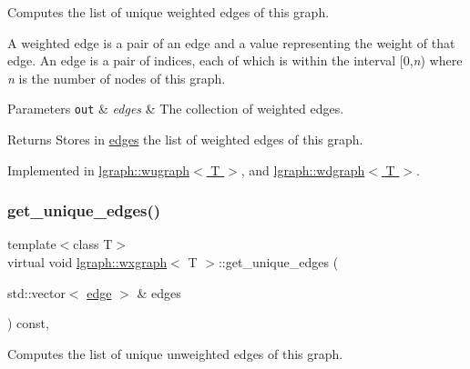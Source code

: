 Computes the list of unique weighted edges of this graph. 

A weighted edge is a pair of an edge and a value representing the weight of that edge. An edge is a pair of indices, each of which is within the interval \mbox{[}0,{\itshape n}) where {\itshape n} is the number of nodes of this graph.


\begin{DoxyParams}[1]{Parameters}
\mbox{\tt out}  & {\em edges} & The collection of weighted edges. \\
\hline
\end{DoxyParams}
\begin{DoxyReturn}{Returns}
Stores in \hyperlink{classlgraph_1_1wxgraph_a1b89f56544185e33d54e72a8ed19a789}{edges} the list of weighted edges of this graph. 
\end{DoxyReturn}


Implemented in \hyperlink{classlgraph_1_1wugraph_af0172a57b7e544029b849f096811c36f}{lgraph\+::wugraph$<$ T $>$}, and \hyperlink{classlgraph_1_1wdgraph_a1b290b91e69ad2c6f667244763f7d709}{lgraph\+::wdgraph$<$ T $>$}.

\mbox{\label{classlgraph_1_1wxgraph_a6c1de8061b1606071320a01dd1b5fe64}} 
\subsubsection{\texorpdfstring{get\+\_\+unique\+\_\+edges()}{get\_unique\_edges()}\hspace{0.1cm}{\footnotesize\ttfamily [2/2]}}
{\footnotesize\ttfamily template$<$class T$>$ \\
virtual void \hyperlink{classlgraph_1_1wxgraph}{lgraph\+::wxgraph}$<$ T $>$\+::get\+\_\+unique\+\_\+edges (\begin{DoxyParamCaption}\item[{std\+::vector$<$ \hyperlink{namespacelgraph_a76bd7d50719f03de7a85db259d80d572}{edge} $>$ \&}]{edges }\end{DoxyParamCaption}) const\hspace{0.3cm}{\ttfamily [protected]}, {}}



Computes the list of unique unweighted edges of this graph. 

